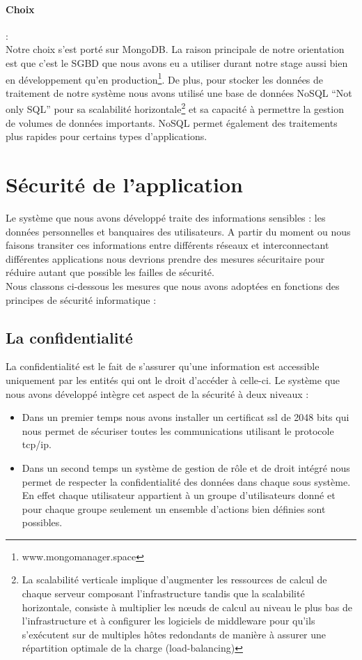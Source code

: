 \paragraph{Choix}:
$ $\\Notre choix s’est porté sur MongoDB. La raison principale de notre orientation est que c’est le SGBD que nous avons eu a utiliser durant notre stage aussi bien en développement qu’en production\footnote{www.mongomanager.space}. De plus, pour stocker les données de traitement de notre système nous avons utilisé une base de données NoSQL “Not only SQL” pour sa scalabilité horizontale\footnote{La scalabilité verticale implique d’augmenter les ressources de calcul de chaque serveur composant l’infrastructure tandis que la scalabilité horizontale, consiste à multiplier les nœuds de calcul au niveau le plus bas de l’infrastructure et à configurer les logiciels de middleware pour qu’ils s’exécutent sur de multiples hôtes redondants de manière à assurer une répartition optimale de la charge (load-balancing)} et sa capacité à permettre la gestion de volumes de données importants. NoSQL permet également des traitements plus rapides pour certains types d'applications.


\section{Sécurité de l’application}
Le système que nous avons développé traite des informations sensibles : les données personnelles et banquaires des utilisateurs. A partir du moment ou nous faisons transiter ces informations
entre différents réseaux et interconnectant différentes applications nous devrions
prendre des mesures sécuritaire pour réduire autant que possible les failles de
sécurité.
$ $\\Nous classons ci-dessous les mesures que nous avons adoptées en fonctions
des principes de sécurité informatique :
\subsection{La confidentialité}
La confidentialité est le fait de s’assurer qu’une information est accessible
uniquement par les entités qui ont le droit d’accéder à celle-ci.
Le système que nous avons développé intègre cet aspect de la sécurité à deux
niveaux :
\begin{itemize}
	\item[\textbullet] Dans un premier temps nous avons installer un certificat ssl de 2048 bits
	qui nous permet de sécuriser toutes les communications utilisant le
	protocole tcp/ip.
	\item[\textbullet] Dans un second temps un système de gestion de rôle et de droit intégré
	nous permet de respecter la confidentialité des données dans chaque sous
	système. En effet chaque utilisateur appartient à un groupe
	d’utilisateurs donné et pour chaque groupe seulement un ensemble
	d’actions bien définies sont possibles.
\end{itemize}
